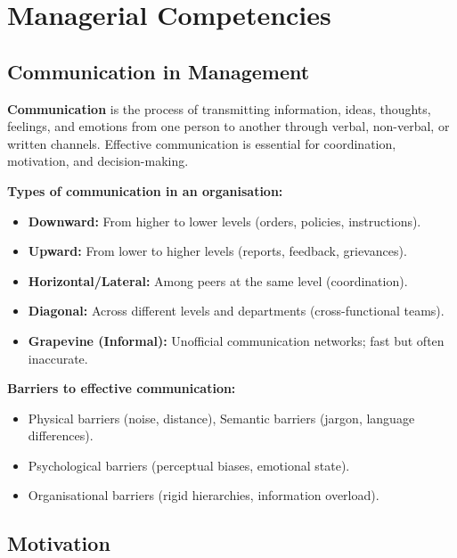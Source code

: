 \documentclass[12pt,a4paper]{article}
\begin{document}
\section{Managerial Competencies}

\subsection{Communication in Management}

\begin{tcolorbox}[defbox, title={\textbf{Communication --- Definition}}]
\textbf{Communication} is the process of transmitting information, ideas, thoughts, feelings, and emotions from one person to another through verbal, non-verbal, or written channels. Effective communication is essential for coordination, motivation, and decision-making.
\end{tcolorbox}

\textbf{Types of communication in an organisation:}
\begin{itemize}[leftmargin=*, itemsep=2pt]
  \item \textbf{Downward:} From higher to lower levels (orders, policies, instructions).
  \item \textbf{Upward:} From lower to higher levels (reports, feedback, grievances).
  \item \textbf{Horizontal/Lateral:} Among peers at the same level (coordination).
  \item \textbf{Diagonal:} Across different levels and departments (cross-functional teams).
  \item \textbf{Grapevine (Informal):} Unofficial communication networks; fast but often inaccurate.
\end{itemize}

\textbf{Barriers to effective communication:}
\begin{itemize}[leftmargin=*, itemsep=2pt]
  \item Physical barriers (noise, distance), Semantic barriers (jargon, language differences).
  \item Psychological barriers (perceptual biases, emotional state).
  \item Organisational barriers (rigid hierarchies, information overload).
\end{itemize}

\subsection{Motivation}
\end{document}
